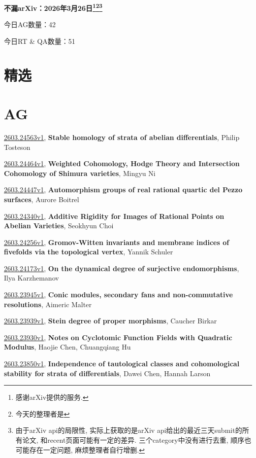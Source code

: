 \documentclass[9pt, a4paper]{article}
\theoremstyle{plain}
\theoremstyle{definition}
\theoremstyle{remark}
\newcommand{\arxiv}[3]{\href{https://arxiv.org/abs/#1}{#1}, \textbf{\textcolor{arxivblue}{#2}}, #3}
\newcommand{\AGnumber}{42}
\newcommand{\RTQAnumber}{51}
\newcommand{\NewestDate}{2026年3月26日}
\newcommand{\todayarXiver}{} %
\begin{document}
\begin{center}
    \Huge\textbf{不漏arXiv：\NewestDate\footnote{感谢arXiv提供的服务.}\footnote{今天的整理者是\todayarXiver}\footnote{由于arXiv api的局限性, 实际上获取的是arXiv api给出的最近三天submit的所有论文, 和recent页面可能有一定的差异. 三个category中没有进行去重, 顺序也可能存在一定问题, 麻烦整理者自行增删.}} \\
\end{center}

\setcounter{section}{-1}

\begin{center}
    今日AG数量：\AGnumber
    
    今日RT \& QA数量：\RTQAnumber
    
\end{center}


\section{精选}


\section{AG}
\arxiv{2603.24563v1}{Stable homology of strata of abelian differentials}{Philip Tosteson}

\arxiv{2603.24464v1}{Weighted Cohomology, Hodge Theory and Intersection Cohomology of Shimura varieties}{Mingyu Ni}

\arxiv{2603.24447v1}{Automorphism groups of real rational quartic del Pezzo surfaces}{Aurore Boitrel}

\arxiv{2603.24340v1}{Additive Rigidity for Images of Rational Points on Abelian Varieties}{Seokhyun Choi}

\arxiv{2603.24256v1}{Gromov-Witten invariants and membrane indices of fivefolds via the topological vertex}{Yannik Schuler}

\arxiv{2603.24173v1}{On the dynamical degree of surjective endomorphisms}{Ilya Karzhemanov}

\arxiv{2603.23945v1}{Conic modules, secondary fans and non-commutative resolutions}{Aimeric Malter}

\arxiv{2603.23939v1}{Stein degree of proper morphisms}{Caucher Birkar}

\arxiv{2603.23930v1}{Notes on Cyclotomic Function Fields with Quadratic Modulus}{Haojie Chen, Chuangqiang Hu}

\arxiv{2603.23850v1}{Independence of tautological classes and cohomological stability for strata of differentials}{Dawei Chen, Hannah Larson}
\end{document}
